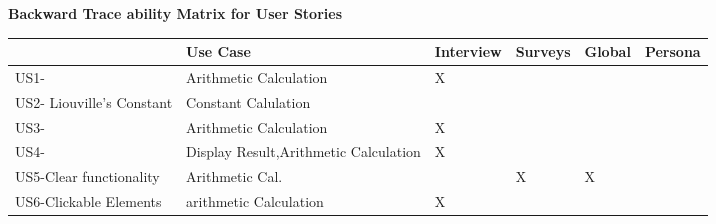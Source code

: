 \documentclass[12pt]{article}
\begin{document}
\newpage
\begin{rSection}
{\Large \textbf{Backward Trace ability Matrix for User Stories}}\vspace{1em}
\end{rSection}
\newline
\newline
\begin{tabular}{|p{3cm}|p{4cm}|p{2cm}|p{2cm}|p{2cm}|p{2cm}| }
\hline
 \textbf {   }& \textbf{Use Case} & \textbf{Interview} & \textbf{Surveys} & \textbf{Global}& \textbf{Persona} \\
 \hline
 US1-& Arithmetic Calculation & X  &  & &  \\
 \hline
 US2- Liouville's Constant & Constant Calulation &  &  & &  \\
  \hline
 US3-& Arithmetic Calculation & X &  & &  \\
  \hline
 US4-& Display Result,Arithmetic Calculation & X &  & &  \\
  \hline
 US5-Clear functionality & Arithmetic Cal. &  & X & X & &\\
  \hline
 US6-Clickable Elements & arithmetic Calculation & X &  & & & \\
  \hline
\end{tabular}
\newpage
\end{document}
